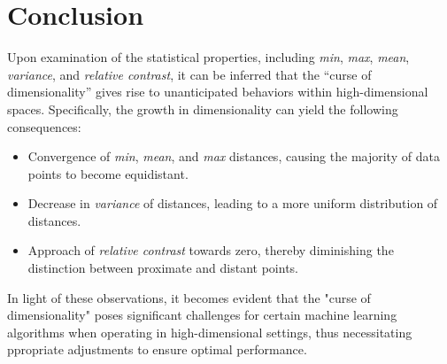 \section{Conclusion}
Upon examination of the statistical properties, including \emph{min}, \emph{max},
\emph{mean}, \emph{variance}, and \emph{relative contrast}, it can be inferred
that the ``curse of dimensionality'' gives rise to unanticipated behaviors within
high-dimensional spaces. Specifically, the growth in dimensionality can yield
the following consequences:


\begin{itemize}
    \item Convergence of \emph{min}, \emph{mean}, and \emph{max} distances,
    causing the majority of data points to become equidistant.
    \item Decrease in \emph{variance} of distances, leading to a more uniform
    distribution of distances.
    \item Approach of \emph{relative contrast} towards zero, thereby
    diminishing the distinction between proximate and distant points.
\end{itemize}

In light of these observations, it becomes evident that the "curse of
dimensionality" poses significant challenges for certain machine learning
algorithms when operating in high-dimensional settings, thus necessitating 
ppropriate adjustments to ensure optimal performance.